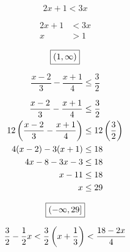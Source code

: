 \documentclass[letterpaper, landscape]{exam}
\begin{document}
\begin{questions}
    \question[5]
      \[
        2x + 1 < 3x
      \]

      \begin{solution}
        \begin{align*}
          2x + 1 & < 3x \\
          x      & > 1 \\
        \end{align*}
        \[
          \boxed{ \intoo{ 1, \infty } }
        \]
    \end{solution}

    \ifprintanswers{}
      \newpage
    \fi

    \question[10]
      \[ 
        \frac{x - 2}{3} - \frac{x + 1}{4} \leq \frac{3}{2} 
      \]

      \begin{solution}
        \begin{align*}
          \frac{x - 2}{3} - \frac{x + 1}{4}            & \leq \frac{3}{2} \\
          12 \del{ \frac{x - 2}{3} - \frac{x + 1}{4} } & \leq 12 \del{ \frac{3}{2} } \\
          4(x - 2) - 3(x + 1)                          & \leq 18 \\
          4x - 8 - 3x - 3                              & \leq 18 \\
          x - 11                                       & \leq 18 \\
          x                                            & \leq 29 \\
        \end{align*}
        
        \[
          \boxed{ \intoc{ -\infty, 29 } }
        \]

      \end{solution}

    \ifprintanswers{}
      \newpage
    \fi

    \question[10]
      \[ 
         \frac{3}{2} - \frac{1}{2} x < \frac{3}{2} \del{ x + \frac{1}{3} }  < \frac{18 - 2x}{4}
      \]


\end{questions}
\end{document}
